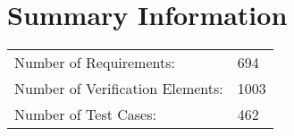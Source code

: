 \newpage
\section{Summary Information}
\begin{longtable}{ll}
\toprule
Number of Requirements: & 694 \\
Number of Verification Elements: & 1003 \\
Number of Test Cases: & 462 \\
\bottomrule
\end{longtable}
